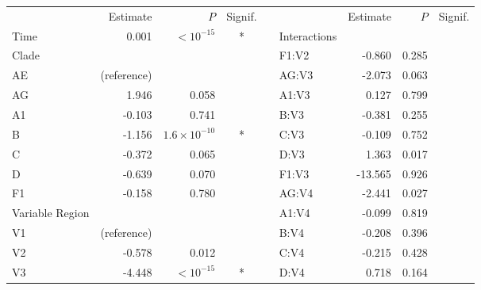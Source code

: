 \documentclass[12pt]{article}
\begin{document}
\begin{table}[htbp]
\renewcommand{\arraystretch}{1.15}
  \centering
  \begin{tabular}{lrrcclrrc}
    \hline
   & Estimate & $P$ & Signif.   &&  & Estimate & $P$ & Signif. \\ 
    \cline{1-4} \cline{6-9}
    
    Time & 0.001 & $<10^{-15}$ & * & & Interactions \\ 
	Clade  &  &  &  &  & \hspace{1em}F1:V2 & -0.860 & 0.285 &  \\ 
  \hspace{1em}AE &  (reference) &  &  && \hspace{1em}AG:V3 & -2.073 & 0.063 &  \\ 
  \hspace{1em}AG & 1.946 & 0.058 &  &  &\hspace{1em}A1:V3 & 0.127 & 0.799 &  \\ 
  \hspace{1em}A1 & -0.103 & 0.741 &  & &\hspace{1em}B:V3 & -0.381 & 0.255 &  \\ 
  \hspace{1em}B & -1.156 & $1.6\times 10^{-10}$ & * & &\hspace{1em}C:V3 & -0.109 & 0.752 & \\ 
  \hspace{1em}C & -0.372 & 0.065 & &&\hspace{1em}D:V3 & 1.363 & 0.017 &  \\ 
  \hspace{1em}D & -0.639 & 0.070 & &&\hspace{1em}F1:V3 & -13.565 & 0.926 & \\ 
  \hspace{1em}F1 & -0.158 & 0.780 && & \hspace{1em}AG:V4 & -2.441 & 0.027 & \\ 
  Variable Region  & & & & &\hspace{1em}A1:V4 & -0.099 & 0.819 & \\ 
  \hspace{1em}V1 & (reference) & & & &\hspace{1em}B:V4 & -0.208 & 0.396 & \\
  \hspace{1em}V2 & -0.578 & 0.012 &  & &\hspace{1em}C:V4 & -0.215 & 0.428 & \\ 
  \hspace{1em}V3 & -4.448 & $<10^{-15}$ & * &  &\hspace{1em}D:V4 & 0.718 & 0.164 &\\ 

\end{tabular}
\end{table}
\end{document}
